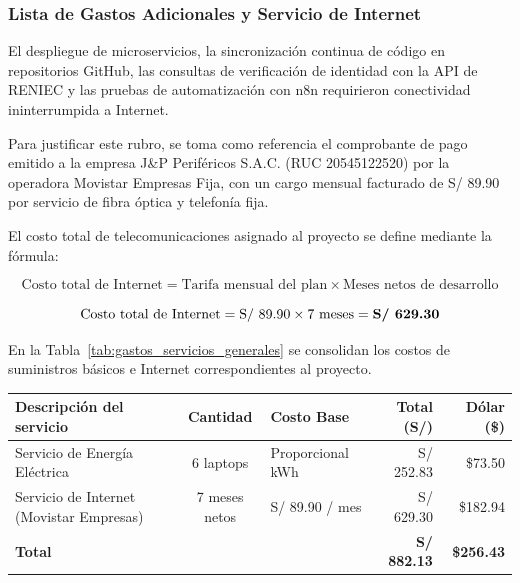 \subsubsection{Lista de Gastos Adicionales y Servicio de Internet}

El despliegue de microservicios, la sincronización continua de código en repositorios GitHub, 
las consultas de verificación de identidad con la API de RENIEC y las pruebas de automatización con n8n requirieron conectividad ininterrumpida a Internet. 

Para justificar este rubro, se toma como referencia el comprobante de pago emitido a la empresa J\&P Periféricos S.A.C. (RUC 20545122520) 
por la operadora Movistar Empresas Fija, con un cargo mensual facturado de S/ 89.90 por servicio de fibra óptica y telefonía fija.

El costo total de telecomunicaciones asignado al proyecto se define mediante la fórmula:

\begin{equation}
    \text{Costo total de Internet} = \text{Tarifa mensual del plan} \times \text{Meses netos de desarrollo}
\end{equation}

\begin{equation*}
    \text{Costo total de Internet} = \text{S/ } 89.90 \times 7\text{ meses} = \text{\textbf{S/ 629.30}}
\end{equation*}

En la Tabla~\ref{tab:gastos_servicios_generales} se consolidan los costos de suministros básicos e Internet correspondientes al proyecto.

\par
\noindent
\begin{minipage}{\linewidth}

    \begingroup
    \renewcommand{\baselinestretch}{1}
    \footnotesize
    \setlength{\tabcolsep}{4pt}
    \renewcommand{\arraystretch}{1.25}

    \begin{tabularx}{\linewidth}{@{}p{4.6cm}c p{2.6cm}r r@{}}
        \toprule
        \textbf{Descripción del servicio} & \textbf{Cantidad} & \textbf{Costo Base} & \textbf{Total (S/)} & \textbf{Dólar (\$)} \\ \midrule
        Servicio de Energía Eléctrica & 6 laptops & Proporcional kWh & S/ 252.83 & \$73.50 \\ 
        Servicio de Internet (Movistar Empresas) & 7 meses netos & S/ 89.90 / mes & S/ 629.30 & \$182.94 \\ \midrule
        \textbf{Total} & & & \textbf{S/ 882.13} & \textbf{\$256.43} \\ \bottomrule
    \end{tabularx}
    \endgroup

\end{minipage}
\finBloqueAPA